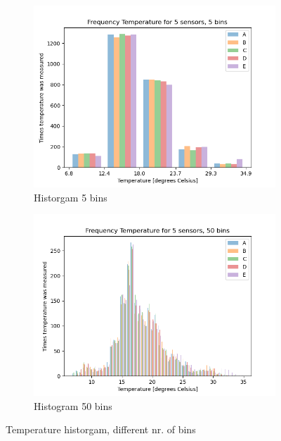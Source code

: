 \documentclass{report}
\begin{document}
	\begin{figure}[h!]
		\centering
		\begin{subfigure}[b]{0.45\linewidth}
			\includegraphics[width=\linewidth]{GEO1001_hw01_images/GEO1001_hw01_A1_hist_5.png}
			\caption{Historgam 5 bins}
		\end{subfigure}
		\begin{subfigure}[b]{0.45\linewidth}
			\includegraphics[width=\linewidth]{GEO1001_hw01_images/GEO1001_hw01_A1_hist_50.png}
			\caption{Histogram 50 bins}
		\end{subfigure}
		\caption{Temperature historgam, different nr. of bins}
		\label{fig:histA1}
	\end{figure}
\end{document}
